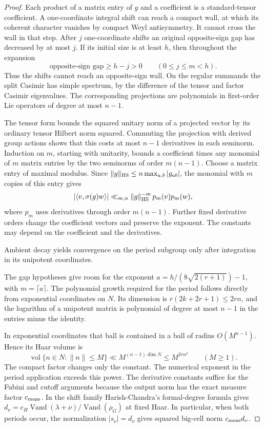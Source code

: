 \begin{proof}

Each product of a
matrix entry of \(g\) and a coefficient is a standard-tensor
coefficient. A one-coordinate integral shift can reach a compact
wall, at which its coherent character vanishes by compact Weyl
antisymmetry. It cannot cross the wall in that step. After \(j\) one-coordinate shifts an original opposite-sign
gap has decreased by at most \(j\). If its initial size is at least
\(h\), then throughout the expansion
\[
          \text{opposite-sign gap}\ge h-j>0\qquad(0\le j\le m<h).
\]
Thus the shifts cannot reach an opposite-sign wall. On the regular
summands the split Casimir has simple spectrum, by the difference
of the tensor and factor Casimir eigenvalues. The corresponding
projections are polynomials in first-order Lie operators of degree
at most \(n-1\).

The tensor form bounds the squared unitary norm
of a projected vector by its ordinary tensor Hilbert norm squared.
Commuting the projection with derived group actions shows that
this costs at most \(n-1\) derivatives in each seminorm. Induction
on \(m\), starting with unitarity, bounds a coefficient times any
monomial of \(m\) matrix entries by the two seminorms of order
\(m(n-1)\). Choose a matrix entry of maximal modulus. Since
\(\|g\|_{\rm HS}\le n\max_{a,b}|g_{ab}|\), the monomial
with \(m\) copies of this entry gives
\[
     |\langle v,\sigma(g)w\rangle|\ll_{m,n}
             \|g\|_{\rm HS}^{-m}\,p_m(v)p_m(w),
\]
where \(p_m\) uses derivatives through order \(m(n-1)\). Further fixed derivative orders change the
coefficient vectors and preserve the exponent. The constants may
depend on the coefficient and the derivatives.


Ambient decay yields convergence on the period subgroup only after integration in its unipotent coordinates.


The gap hypotheses give room for the exponent
\(a=h/(8\sqrt{2(r+1)})-1\), with \(m=\lceil a\rceil\). The
polynomial growth required for the period follows directly from
exponential coordinates on \(N\). Its dimension is
\(r(2k+2r+1)\le 2rn\), and the logarithm of a unipotent matrix is
polynomial of degree at most \(n-1\) in the entries minus the
identity.

In exponential coordinates that ball is contained in a ball
of radius \(O(M^{n-1})\). Hence its Haar volume is
\[
     \operatorname{vol}\{n\in N:\|n\|\le M\}
           \ll M^{(n-1)\dim N}\le M^{2rn^2}\qquad(M\ge1).
\]
The compact factor changes only the constant.
The numerical exponent in the period application exceeds this
power. The derivative constants suffice for the Fubini and cutoff
arguments because the output norm has the exact measure factor
\(c_{\rm meas}\). In the shift family Harish-Chandra's formal-degree
formula gives \(d_\nu=c_H\operatorname{Vand}(\lambda+\nu)/
\operatorname{Vand}(\rho_G)\) at fixed Haar. In particular, when
both periods occur, the normalization \(|s_\nu|=d_\nu\) gives
squared big-cell norm \(c_{\rm meas}d_\nu\).
\end{proof}
